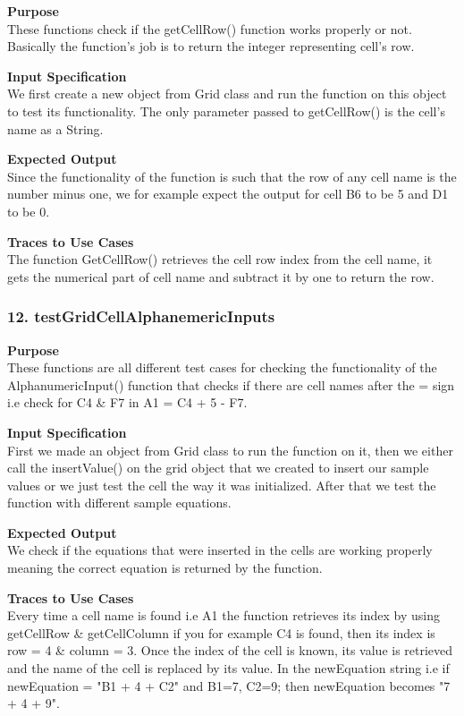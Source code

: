 \documentclass[12pt]{article}
\begin{document}
\noindent
{\bf Purpose}\\
These functions check if the getCellRow() function works properly or not. Basically the function’s job is to return the integer representing cell’s row.

\noindent
{\bf Input Specification}\\
We first create a new object from Grid class and run the function on this object to test its functionality. The only parameter passed to getCellRow() is the cell’s name as a String.

\noindent
{\bf Expected Output}\\
Since the functionality of the function is such that the row of any cell name is the number minus one, we for example expect the output for cell B6 to be 5 and D1 to be 0.

\noindent
{\bf Traces to Use Cases}\\
The function GetCellRow() retrieves the cell row index from the cell name, it gets the numerical part of cell name and subtract it by one to return the row.
\subsubsection{12. testGridCellAlphanemericInputs} \label{tc:1}

\noindent
{\bf Purpose}\\
These functions are all different test cases for checking the functionality of the AlphanumericInput() function that checks if there are cell names after the = sign i.e check for C4 & F7 in A1 = C4 + 5 - F7.

\noindent
{\bf Input Specification}\\
First we made an object from Grid class to run the function on it, then we either call the insertValue() on the grid object that we created to insert our sample values or we just test the cell the way it was initialized. After that we test the function with different sample equations.

\noindent
{\bf Expected Output}\\
We check if the equations that were inserted in the cells are working properly meaning the correct equation is returned by the function.

\noindent
{\bf Traces to Use Cases}\\
Every time a cell name is found  i.e A1 the function retrieves its index by using getCellRow & getCellColumn if you for example C4 is found,  then its index is row = 4 & column = 3. Once the index of the cell is known, its value is retrieved and the name of the cell is replaced by its value. In the newEquation string i.e if newEquation = "B1 + 4 + C2" and B1=7, C2=9; then newEquation becomes "7 + 4 + 9".
\end{document}
